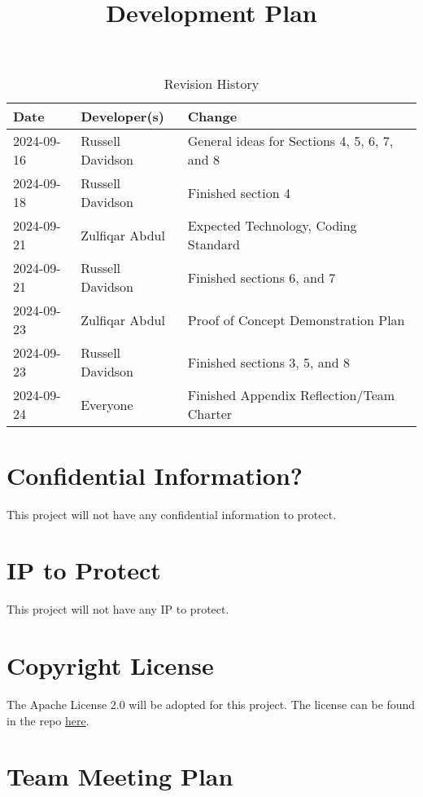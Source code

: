 \documentclass{article}
\title{Development Plan\\\progname}
\author{\authname}
\date{}
\begin{document}
\maketitle

\begin{table}[hp]
\caption{Revision History} \label{TblRevisionHistory}
\begin{tabularx}{\textwidth}{llX}
\toprule
\textbf{Date} & \textbf{Developer(s)} & \textbf{Change}\\
\midrule
2024-09-16 & Russell Davidson & General ideas for Sections 4, 5, 6, 7, and 8\\
2024-09-18 & Russell Davidson & Finished section 4\\
2024-09-21 & Zulfiqar Abdul & Expected Technology, Coding Standard\\
2024-09-21 & Russell Davidson & Finished sections 6, and 7\\
2024-09-23 & Zulfiqar Abdul & Proof of Concept Demonstration Plan\\
2024-09-23 & Russell Davidson & Finished sections 3, 5, and 8\\
2024-09-24 & Everyone & Finished Appendix Reflection/Team Charter\\
\bottomrule
\end{tabularx}
\end{table}

\newpage{}

\section{Confidential Information?}

This project will not have any confidential information to protect.

\section{IP to Protect}

This project will not have any IP to protect.

\section{Copyright License}

The Apache License 2.0 will be adopted for this project. The license can be found in the repo \href{https://github.com/russellrd/realm/blob/main/LICENSE}{here}.

\section{Team Meeting Plan} \label{team_meeting_plan}
\end{document}
